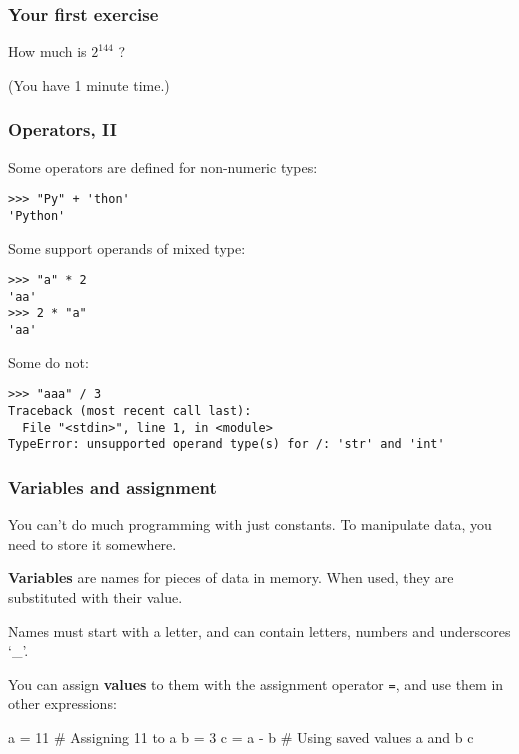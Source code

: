 \documentclass[english,serif,mathserif,xcolor=pdftex,dvipsnames,table]{beamer}
\begin{document}
\begin{frame}
  \frametitle{Your first exercise}
    \begin{center}
      {\Large How much is \href{http://www.pythonchallenge.com}{$2^{144}$} ?}

      \+ (You have 1 minute time.)
    \end{center}
\end{frame}


\begin{frame}[fragile]
  \frametitle{Operators, II}
  \smaller

  Some operators are defined for non-numeric types:
\begin{lstlisting}
>>> "Py" + 'thon'
'Python'
\end{lstlisting}

  \+
  Some support operands of mixed type:
\begin{lstlisting}
>>> "a" * 2
'aa'
>>> 2 * "a"
'aa'
\end{lstlisting}

  \+
  Some do not:
\begin{lstlisting}[basicstyle=\footnotesize\ttfamily]
>>> "aaa" / 3
Traceback (most recent call last):
  File "<stdin>", line 1, in <module>
TypeError: unsupported operand type(s) for /: 'str' and 'int'
\end{lstlisting}
\end{frame}


\begin{frame}[fragile]
  \frametitle{Variables and assignment}

  You can't do much programming with just constants.
  To manipulate data, you need to store it somewhere.

  \+
  \textbf{Variables} are names for pieces of data in memory.
  When used, they are substituted with their value.

  \+
  Names must start with a letter, and can contain letters, numbers and underscores `\_'.

  \+
  You can assign \textbf{values} to them with the assignment operator \texttt{=},
  and use them in other expressions:

\begin{semiverbatim}
\In a = 11 # Assigning 11 to a
\In b = 3
\In c = a - b # Using saved values a and b
\In c
\end{semiverbatim}
\end{frame}
\end{document}

